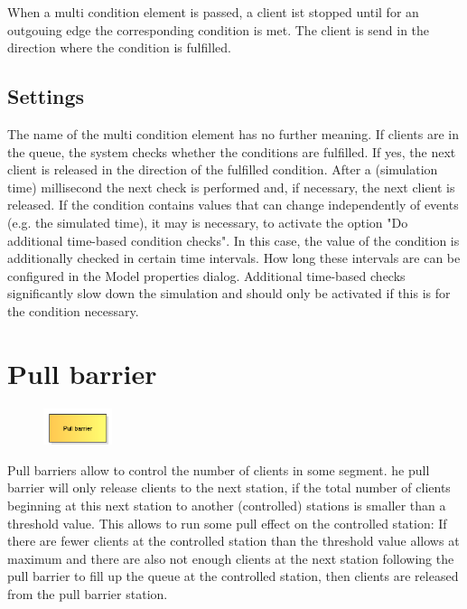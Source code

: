 When a multi condition element is passed, a client ist stopped until for an outgouing edge the
corresponding condition is met. The client is send in the direction where the condition is fulfilled.

\subsection*{Settings}

The name of the multi condition element has no further meaning.
If clients are in the queue, the system checks whether the conditions are fulfilled.
If yes, the next client is released in the direction of the fulfilled condition. After a (simulation time) millisecond the next check
is performed and, if necessary, the next client is released.
If the condition contains values that can change independently of events (e.g. the simulated time),
it may is necessary, to activate the option "Do additional time-based condition checks". In this case,
the value of the condition is additionally checked in certain time intervals. How long these intervals
are can be configured in the Model properties dialog.
Additional time-based checks significantly slow down the simulation and should only be activated
if this is for the condition necessary.


\section{Pull barrier}
\label{ref:ModelElementBarrierPull}

\begin{figure}
\vspace{-22pt}
\includegraphics[width=2cm]{imageModelElementBarrierPull.png}
\vspace{-22pt}
\end{figure}

Pull barriers allow to control the number of clients in some segment.
he pull barrier will only release clients to the next station, if
the total number of clients beginning at this next station to another
(controlled) stations is smaller than a threshold value. This allows to
run some pull effect on the controlled station: If there are
fewer clients at the controlled station than the threshold value allows
at maximum and there are also not enough clients at the next station
following the pull barrier to fill up the queue at the controlled station,
then clients are released from the pull barrier station.


